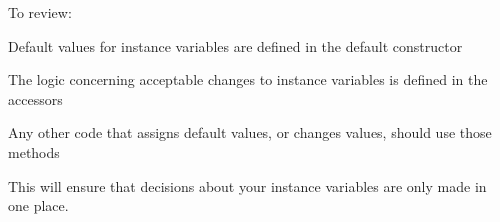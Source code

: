 To review:
\bi
\item Default values for instance variables are defined in the default constructor
\item The logic concerning acceptable changes to instance variables is defined in the accessors
\item Any other code that assigns default values, or changes values, should use those methods
\ei

This will ensure that decisions about your instance variables are only made in one place.
